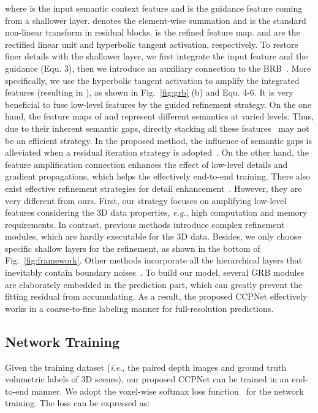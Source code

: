\documentclass[10pt,twocolumn,letterpaper]{article}
\begin{document}
where  is the input semantic context feature and  is the guidance feature coming from a shallower layer.
 denotes the element-wise summation and  is the standard non-linear transform in residual blocks.
 is the refined feature map.
 and  are the rectified linear unit and hyperbolic tangent activation, respectively.
To restore finer details with the shallower layer, we first integrate the input feature and the guidance (Equ. 3), then we introduce an auxiliary connection to the BRB~\cite{he2016deep}.
More specifically, we use the hyperbolic tangent activation to amplify the integrated features (resulting in ), as shown in Fig.~\ref{fig:grb} (b) and Equ. 4-6.
It is very beneficial to fuse low-level features by the guided refinement strategy.
On the one hand, the feature maps of  and  represent different semantics at varied levels.
Thus, due to their inherent semantic gaps, directly stacking all these features~\cite{hariharan2015hypercolumns,ronneberger2015u,cciccek20163d} may not be an efficient strategy.
In the proposed method, the influence of semantic gaps is alleviated when a residual iteration strategy is adopted~\cite{greff2016highway}.
On the other hand, the feature amplification connection enhances the effect of low-level details and gradient propagations, which helps the effectively end-to-end training.
There also exist effective refinement strategies for detail enhancement~\cite{pinheiro2016learning,lin2017refinenet,zhang2017amulet}.
However, they are very different from ours.
First, our strategy focuses on amplifying low-level features considering the 3D data properties, \emph{e.g.}, high computation and memory requirements.
In contrast, previous methods introduce complex refinement modules, which are hardly executable for the 3D data.
Besides, we only choose specific shallow layers for the refinement, as shown in the bottom of Fig.~\ref{fig:framework}.
Other methods incorporate all the hierarchical layers that inevitably contain boundary noises~\cite{pinheiro2016learning,lin2017refinenet}.
To build our model, several GRB modules are elaborately embedded in the prediction part, which can greatly prevent the fitting residual from accumulating.
As a result, the proposed CCPNet effectively works in a coarse-to-fine labeling manner for full-resolution predictions.
\subsection{Network Training}
Given the training dataset (\emph{i.e.}, the paired depth images and ground truth volumetric labels of 3D scenes), our proposed CCPNet can be trained in an end-to-end manner.
We adopt the voxel-wise softmax loss function~\cite{song2017semantic} for the network training.
The loss can be expressed as:
\end{document}
